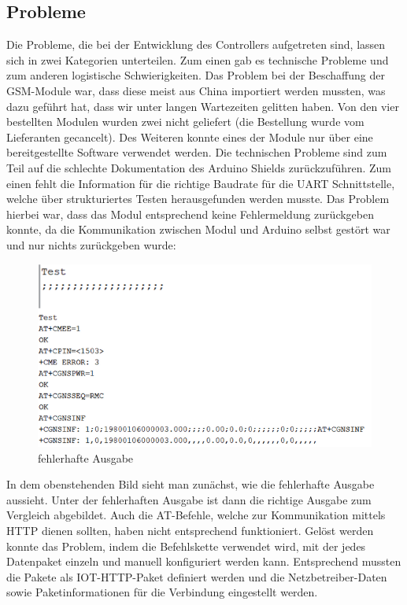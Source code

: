 \subsection{Probleme}
Die Probleme, die bei der Entwicklung des Controllers aufgetreten sind, lassen sich in zwei Kategorien unterteilen. Zum einen gab es technische Probleme und zum anderen logistische Schwierigkeiten.
Das Problem bei der Beschaffung der GSM-Module war, dass diese meist aus China importiert werden mussten, was dazu geführt hat, dass wir unter langen Wartezeiten gelitten haben. Von den vier bestellten Modulen wurden zwei nicht geliefert (die Bestellung wurde vom Lieferanten gecancelt). Des Weiteren konnte eines der Module nur über eine bereitgestellte Software verwendet werden.
Die technischen Probleme sind zum Teil auf die schlechte Dokumentation des Arduino Shields zurückzuführen. Zum einen fehlt die Information für die richtige Baudrate für die UART Schnittstelle, welche über strukturiertes Testen herausgefunden werden musste. Das Problem hierbei war, dass das Modul entsprechend keine Fehlermeldung zurückgeben konnte, da die Kommunikation zwischen Modul und Arduino selbst gestört war und nur nichts zurückgeben wurde:
\begin{figure} [H]
	\begin{center}
		\includegraphics[width=1\textwidth]{Bilder/Arduino_Probleme.png}
		\caption{fehlerhafte Ausgabe}
		\label{Arduinoproblem}
	\end{center}
\end{figure}
In dem obenstehenden Bild sieht man zunächst, wie die fehlerhafte Ausgabe aussieht. Unter der fehlerhaften Ausgabe ist dann die richtige Ausgabe zum Vergleich abgebildet.
Auch die AT-Befehle, welche zur Kommunikation mittels HTTP dienen sollten, haben nicht entsprechend funktioniert. Gelöst werden konnte das Problem, indem die Befehlskette verwendet wird, mit der jedes Datenpaket einzeln und manuell konfiguriert werden kann. Entsprechend mussten die Pakete als IOT-HTTP-Paket definiert werden und die Netzbetreiber-Daten sowie Paketinformationen für die Verbindung eingestellt werden.
